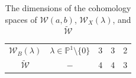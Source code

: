 \documentclass[11pt, svgnames]{amsart}
\newcommand{\PP}{\mathbb{P}}
\newcommand{\W}{\mathcal{W}}
\newcommand{\nonzero}{\setminus \{0\}}
\theoremstyle{definition}
\begin{document}
\begin{table}[ht]
\begin{tabular}{|c|c|ccc|}
\multirow{2}{*}{$\W_B(\lambda)$} & \multirow{2}{*}{$\lambda \in \PP^1 \nonzero$} & \multicolumn{1}{c|}{\multirow{2}{*}{3}} & \multicolumn{1}{c|}{\multirow{2}{*}{3}} & \multirow{2}{*}{2} \\
                                 &                                               & \multicolumn{1}{c|}{}                   & \multicolumn{1}{c|}{}                   &                    \\ \hline
\multirow{2}{*}{$\widetilde{\W}$} & \multirow{2}{*}{$-$} & \multicolumn{1}{c|}{\multirow{2}{*}{4}} & \multicolumn{1}{c|}{\multirow{2}{*}{4}} & \multirow{2}{*}{3} \\
                                 &                                               & \multicolumn{1}{c|}{}                   & \multicolumn{1}{c|}{}                   &                    \\ \hline
\end{tabular}
\caption{The dimensions of the cohomology spaces of $\W(a,b)$, $\W_X(\lambda)$, and $\widetilde{\W}$}
\end{table}
\end{document}
